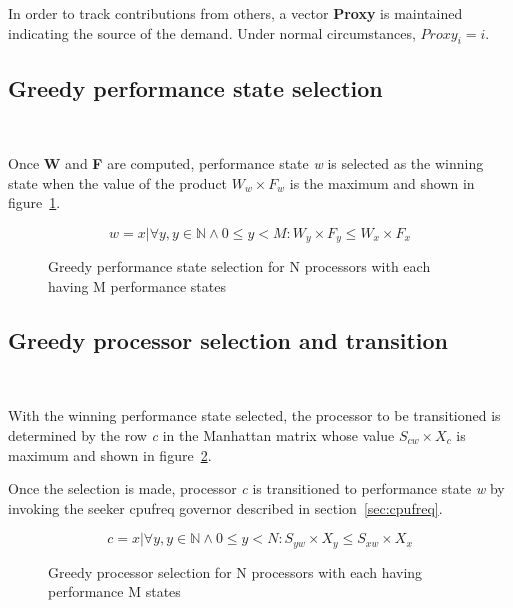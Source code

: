 In order to track contributions from others, a vector \textbf{Proxy} is maintained indicating 
the source of the demand. Under normal circumstances, $Proxy_i = i$. 

\subsection{Greedy performance state selection}~\label{sec:winner_state}

Once \textbf{W} and \textbf{F} are computed, performance state \textit{w} is selected
as the winning state when the value of the product $W_w \times F_w$ is the maximum and 
shown in figure~\ref{fig:winning_state}. 


\begin{figure}[h!]
\centering
\begin{equation*}
    w = {x | \forall y, y \in \mathbb{N} \wedge 0 \leq y < M : W_y \times F_y \leq W_x \times F_x}
\end{equation*}
\caption{Greedy performance state selection for N processors with each having M performance states}
\label{fig:winning_state}
\end{figure}

\subsection{Greedy processor selection and transition}~\label{sec:winner_proc}

With the winning performance state selected, the processor to be transitioned
is determined by the row \textit{c} in the Manhattan matrix whose value $S_{cw} \times X_c$ 
is maximum and shown in figure~\ref{fig:winning_proc}. 

Once the selection is made, processor \textit{c} is transitioned to performance state
\textit{w} by invoking the seeker cpufreq governor described in section~\ref{sec:cpufreq}.

\begin{figure}[h!]
\centering
\begin{equation*}
    c = {x | \forall y, y \in \mathbb{N} \wedge 0 \leq y < N : S_{yw} \times X_y \leq S_{xw} \times X_x}
\end{equation*}
\caption{Greedy processor selection for N processors with each having performance M states}
\label{fig:winning_proc}
\end{figure}


